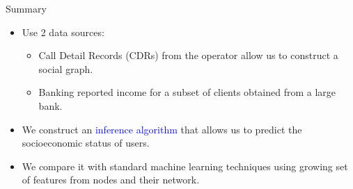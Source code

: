 \documentclass[usenames,dvipsnames]{beamer}
\begin{document}
\begin{frame}{Summary}

\begin{itemize}

\begin{block}{Objective}
Compare methods for the inference of socioeconomic status in the communication graph.
\end{block}
\medskip

\pause

\item Use 2 data sources:
\begin{itemize}
\item Call Detail Records (CDRs) from the operator allow us to construct a social graph.
\item Banking reported income for a subset of clients obtained from a large bank.
\end{itemize} 

\item We construct an \textcolor{blue}{inference algorithm} that allows us to predict the socioeconomic status of users.

\item We compare it with standard machine learning techniques using growing set of features from nodes and their network.

\end{itemize}

\end{frame}
\end{document}
